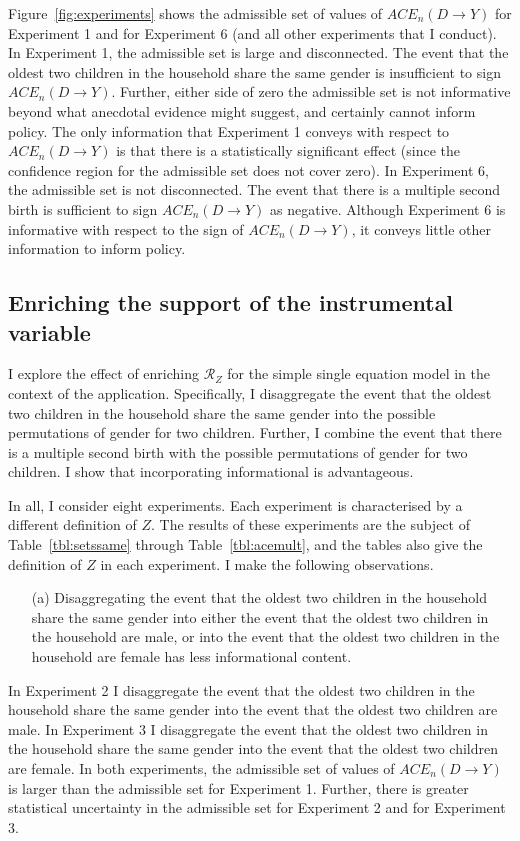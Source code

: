 \documentclass[10pt,a4paper,twoside]{article}
\numberwithin{equation}{section}
\begin{document}
Figure~\ref{fig:experiments} shows the admissible set of values of $ACE_n(D\rightarrow Y)$ for Experiment 1 and for Experiment 6 (and all other experiments that I conduct). In Experiment 1, the admissible set is large and disconnected. The event that the oldest two children in the household share the same gender is insufficient to sign $ACE_n(D\rightarrow Y)$. Further, either side of zero the admissible set is not informative beyond what anecdotal evidence might suggest, and certainly cannot inform policy. The only information that Experiment 1 conveys with respect to $ACE_n(D\rightarrow Y)$ is that there is a statistically significant effect (since the confidence region for the admissible set does not cover zero). In Experiment 6, the admissible set is not disconnected. The event that there is a multiple second birth is sufficient to sign $ACE_n(D\rightarrow Y)$ as negative. Although Experiment 6 is informative with respect to the sign of $ACE_n(D\rightarrow Y)$, it conveys little other information to inform policy.  
\subsection{Enriching the support of the instrumental variable}
I explore the effect of enriching $\mathcal{R}_Z$ for the simple single equation model in the context of the application. Specifically, I disaggregate the event that the oldest two children in the household share the same gender into the possible permutations of gender for two children. Further, I combine the event that there is a multiple second birth with the possible permutations of gender for two children. I show that incorporating informational is advantageous.

In all, I consider eight experiments. Each experiment is characterised by a different definition of $Z$. The results of these experiments are the subject of Table~\ref{tbl:setssame} through Table~\ref{tbl:acemult}, and the tables also give the definition of $Z$ in each experiment. I make the following observations.
\begin{enumerate}
\item[(a)] Disaggregating the event that the oldest two children in the household share the same gender into either the event that the oldest two children in the household are male, or into the event that the oldest two children in the household are female has less informational content.
\end{enumerate}
In Experiment 2 I disaggregate the event that the oldest two children in the household share the same gender into the event that the oldest two children are male. In Experiment 3 I disaggregate the event that the oldest two children in the household share the same gender into the event that the oldest two children are female. In both experiments, the admissible set of values of $ACE_n(D\rightarrow Y)$ is larger than the admissible set for Experiment 1. Further, there is greater statistical uncertainty in the admissible set for Experiment 2 and for Experiment 3.  
\end{document}
